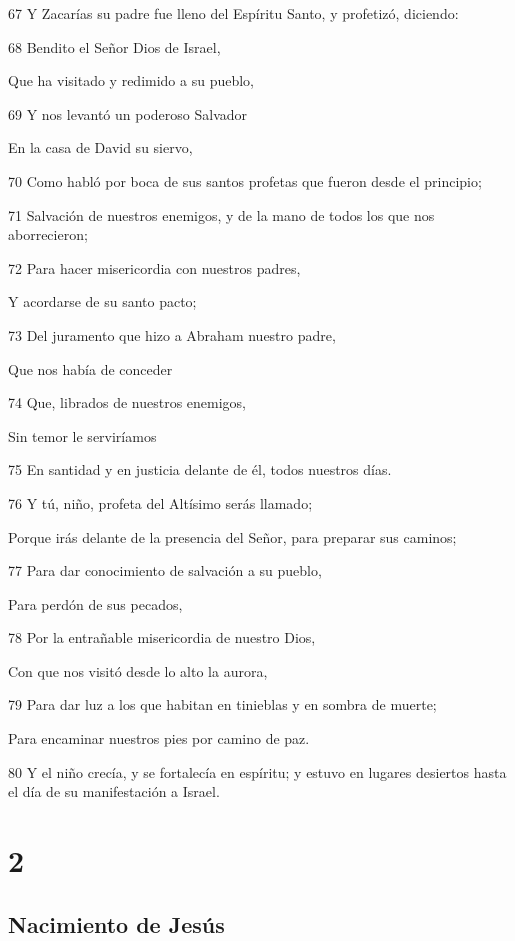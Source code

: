 \par 67 Y Zacarías su padre fue lleno del Espíritu Santo, y profetizó, diciendo:
\par 68 Bendito el Señor Dios de Israel,
\par Que ha visitado y redimido a su pueblo,
\par 69 Y nos levantó un poderoso Salvador
\par En la casa de David su siervo,
\par 70 Como habló por boca de sus santos profetas que fueron desde el principio;
\par 71 Salvación de nuestros enemigos, y de la mano de todos los que nos aborrecieron;
\par 72 Para hacer misericordia con nuestros padres,
\par Y acordarse de su santo pacto;
\par 73 Del juramento que hizo a Abraham nuestro padre,
\par Que nos había de conceder
\par 74 Que, librados de nuestros enemigos,
\par Sin temor le serviríamos
\par 75 En santidad y en justicia delante de él, todos nuestros días.
\par 76 Y tú, niño, profeta del Altísimo serás llamado;
\par Porque irás delante de la presencia del Señor, para preparar sus caminos;
\par 77 Para dar conocimiento de salvación a su pueblo,
\par Para perdón de sus pecados,
\par 78 Por la entrañable misericordia de nuestro Dios,
\par Con que nos visitó desde lo alto la aurora,
\par 79 Para dar luz a los que habitan en tinieblas y en sombra de muerte;
\par Para encaminar nuestros pies por camino de paz.
\par 80 Y el niño crecía, y se fortalecía en espíritu; y estuvo en lugares desiertos hasta el día de su manifestación a Israel.

\chapter{2}

\section*{Nacimiento de Jesús}

